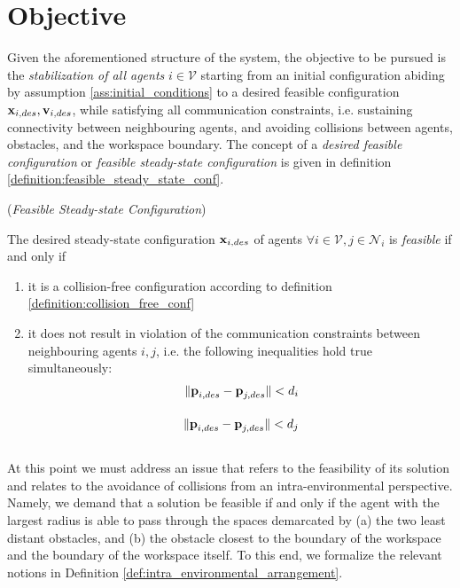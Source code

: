 \section{Objective}

Given the aforementioned structure of the system, the objective to be
pursued is the \textit{stabilization of all agents} $i \in \mathcal{V}$ starting
from an initial configuration abiding by assumption
\eqref{ass:initial_conditions} to a desired feasible configuration
$\bm{\mathbf{x}}_{i,des}, \bm{\mathbf{v}}_{i,des}$, while
satisfying all communication constraints, i.e. sustaining connectivity between
neighbouring agents, and avoiding collisions between agents, obstacles, and the
workspace boundary. The concept of a \textit{desired feasible configuration}
or \textit{feasible steady-state configuration} is given in definition
\eqref{definition:feasible_steady_state_conf}.

\begin{bw_box}
\begin{definition} (\textit{Feasible Steady-state Configuration})
\label{definition:feasible_steady_state_conf}

The desired steady-state configuration $\bm{\mathbf{x}}_{i,des}$ of agents
$\forall i \in \mathcal{V}, j \in \mathcal{N}_i$ is \textit{feasible} if and
only if
\begin{enumerate}
  \item it is a collision-free configuration according to definition
    \eqref{definition:collision_free_conf}
  \item it does not result in violation of the communication constraints
    between neighbouring agents $i,j$, i.e. the following inequalities hold
    true simultaneously:
    \begin{align}
      \|\bm{\mathbf{p}}_{i,des} - \bm{\mathbf{p}}_{j,des}\| < d_i \\[2.5ex]
      \|\bm{\mathbf{p}}_{i,des} - \bm{\mathbf{p}}_{j,des}\| < d_j \\[2.5ex]
    \end{align}
\end{enumerate}

\end{definition}
\end{bw_box}

At this point we must address an issue
that refers to the feasibility of its solution and relates to the avoidance of
collisions from an intra-environmental perspective. Namely, we demand that a
solution be feasible if and only if the agent with the largest radius is able to
pass through the spaces demarcated by (a) the two least distant obstacles,
and (b) the obstacle closest to the boundary of the workspace and the
boundary of the workspace itself. To this end, we formalize the relevant notions
in Definition \eqref{def:intra_environmental_arrangement}. \\[2.5ex]

